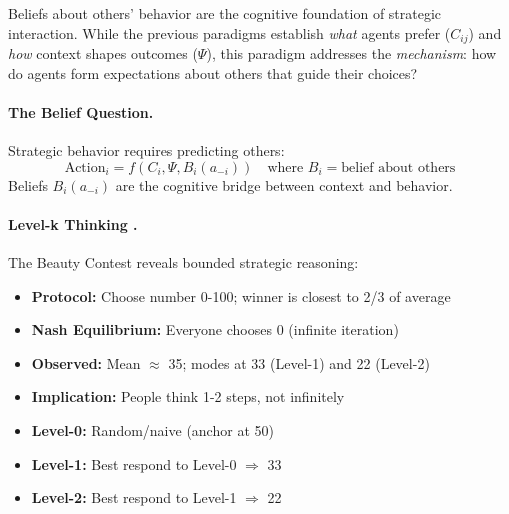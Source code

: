 Beliefs about others' behavior are the cognitive foundation of strategic interaction.
While the previous paradigms establish \emph{what} agents prefer ($C_{ij}$) and
\emph{how} context shapes outcomes ($\Psi$), this paradigm addresses the
\emph{mechanism}: how do agents form expectations about others that guide their choices?

\paragraph{The Belief Question.}
Strategic behavior requires predicting others:
\begin{equation}
\text{Action}_i = f(C_i, \Psi, B_i(a_{-i})) \quad \text{where } B_i = \text{belief about others}
\tag{EV-BELIEF}
\end{equation}
Beliefs $B_i(a_{-i})$ are the cognitive bridge between context and behavior.

\paragraph{Level-k Thinking \citep{nagel1995unraveling}.}
The Beauty Contest reveals bounded strategic reasoning:
\begin{itemize}[nosep]
    \item \textbf{Protocol:} Choose number 0-100; winner is closest to 2/3 of average
    \item \textbf{Nash Equilibrium:} Everyone chooses 0 (infinite iteration)
    \item \textbf{Observed:} Mean $\approx$ 35; modes at 33 (Level-1) and 22 (Level-2)
    \item \textbf{Implication:} People think 1-2 steps, not infinitely
    \item \textbf{Level-0:} Random/naive (anchor at 50)
    \item \textbf{Level-1:} Best respond to Level-0 $\Rightarrow$ 33
    \item \textbf{Level-2:} Best respond to Level-1 $\Rightarrow$ 22
\end{itemize}

